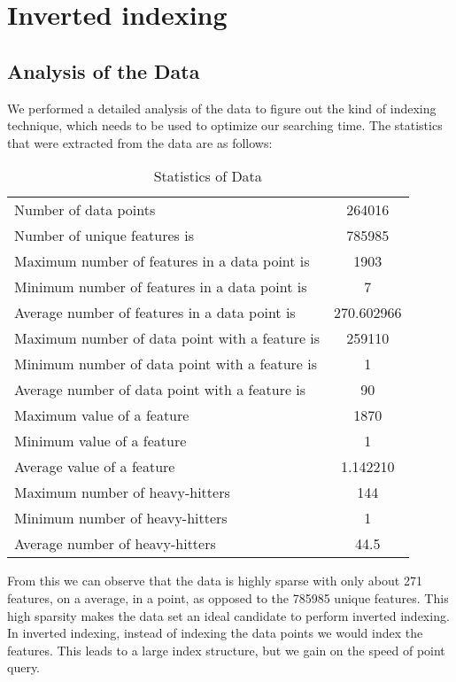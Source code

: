 
\section{Inverted indexing}

\subsection{Analysis of the Data}
We performed a detailed analysis of the data to figure out the kind of indexing technique, which needs to be used to optimize our searching time. The statistics that were extracted from the data are as follows:\\

\begin{table}[ht!]
\centering
\caption{Statistics of Data}
\begin{tabular}{|l|c|}
\hline 
Number of data points & 264016 \\ 
Number of unique features is & 785985 \\ 
Maximum number of features in a data point is & 1903 \\ 
Minimum number of features in a data point is  & 7 \\ 
Average number of features in a data point is & 270.602966 \\ 
Maximum number of data point with a feature is & 259110 \\ 
Minimum number of data point with a feature is & 1 \\ 
Average number of data point with a feature is & 90
 \\ 
Maximum value of a feature  & 1870 \\ 
Minimum value of a feature
 & 1 \\ 
Average value of a feature & 1.142210 \\ 
Maximum number of heavy-hitters  & 144 \\ 
Minimum number of heavy-hitters  & 1 \\ 
 Average number of heavy-hitters  & 44.5 \\ 
\hline 
\end{tabular} 
\end{table}

From this we can observe that the data is highly sparse with only about 271 features, on a average, in a point, as opposed to the 785985 unique features. This high sparsity makes the data set an ideal candidate to perform inverted indexing. In inverted indexing, instead of indexing the data points we would index the features. This leads to a large index structure, but we gain on the speed of point query. \\

